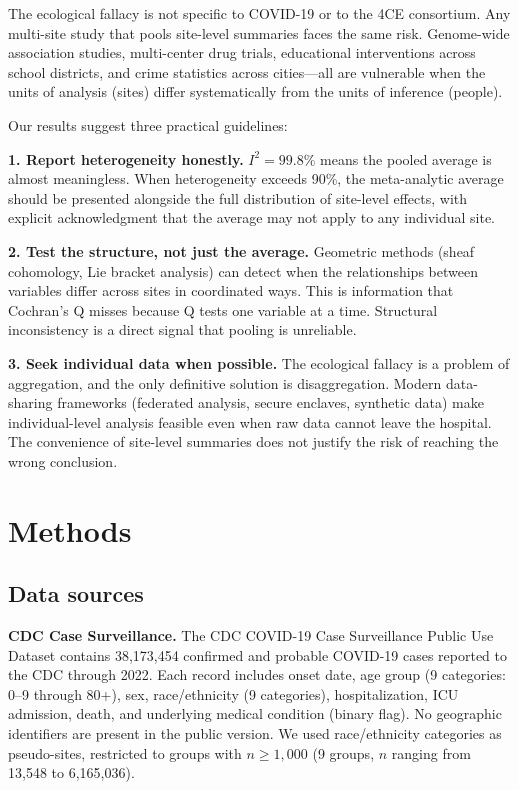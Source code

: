 \documentclass{article}
\begin{document}
The ecological fallacy is not specific to COVID-19 or to the 4CE consortium.
Any multi-site study that pools site-level summaries faces the same risk.
Genome-wide association studies, multi-center drug trials, educational
interventions across school districts, and crime statistics across
cities---all are vulnerable when the units of analysis (sites) differ
systematically from the units of inference (people).

Our results suggest three practical guidelines:

\textbf{1. Report heterogeneity honestly.}  $I^2 = 99.8\%$ means the pooled
average is almost meaningless.  When heterogeneity exceeds 90\%, the meta-analytic
average should be presented alongside the full distribution of site-level
effects, with explicit acknowledgment that the average may not apply to any
individual site.

\textbf{2. Test the structure, not just the average.}  Geometric methods
(sheaf cohomology, Lie bracket analysis) can detect when the relationships
between variables differ across sites in coordinated ways.  This is
information that Cochran's Q misses because Q tests one variable at a time.
Structural inconsistency is a direct signal that pooling is unreliable.

\textbf{3. Seek individual data when possible.}  The ecological fallacy is
a problem of aggregation, and the only definitive solution is disaggregation.
Modern data-sharing frameworks (federated analysis, secure enclaves, synthetic
data) make individual-level analysis feasible even when raw data cannot leave
the hospital.  The convenience of site-level summaries does not justify the
risk of reaching the wrong conclusion.


\section{Methods}

\subsection{Data sources}

\textbf{CDC Case Surveillance.}  The CDC COVID-19 Case Surveillance Public
Use Dataset contains 38,173,454 confirmed and probable COVID-19 cases reported
to the CDC through 2022.  Each record includes onset date, age group (9
categories: 0--9 through 80+), sex, race/ethnicity (9 categories),
hospitalization, ICU admission, death, and underlying medical condition (binary
flag).  No geographic identifiers are present in the public version.  We used
race/ethnicity categories as pseudo-sites, restricted to groups with $n \geq
1{,}000$ (9 groups, $n$ ranging from 13,548 to 6,165,036).
\end{document}
